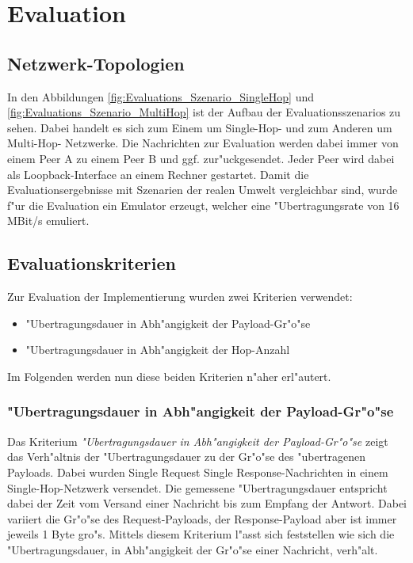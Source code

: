 \chapter{Evaluation}
\label{cha:evaluation}

\section{Netzwerk-Topologien}
In den Abbildungen \ref{fig:Evaluations_Szenario_SingleHop} und \ref{fig:Evaluations_Szenario_MultiHop} ist der Aufbau der Evaluationsszenarios zu sehen. Dabei handelt es sich zum Einem um Single-Hop- und zum Anderen um Multi-Hop- Netzwerke. Die Nachrichten zur Evaluation werden dabei immer von einem Peer A zu einem Peer B und ggf. zur"uckgesendet. Jeder Peer wird dabei als Loopback-Interface an einem Rechner gestartet. Damit die Evaluationsergebnisse mit Szenarien der realen Umwelt vergleichbar sind, wurde f"ur die Evaluation ein Emulator erzeugt, welcher eine "Ubertragungsrate von 16 MBit/s emuliert.

\section{Evaluationskriterien}
Zur Evaluation der Implementierung wurden zwei Kriterien verwendet:
\begin{itemize}
\item "Ubertragungsdauer in Abh"angigkeit der Payload-Gr"o"se
\item "Ubertragungsdauer in Abh"angigkeit der Hop-Anzahl
\end{itemize}
Im Folgenden werden nun diese beiden Kriterien n"aher erl"autert.

\subsection{"Ubertragungsdauer in Abh"angigkeit der Payload-Gr"o"se}
Das Kriterium \emph{"Ubertragungsdauer in Abh"angigkeit der Payload-Gr"o"se} zeigt das Verh"altnis der "Uber\-tra\-gungs\-dauer zu der Gr"o"se des "ubertragenen Payloads. Dabei wurden Single Request Single Response-Nachrichten in einem Single-Hop-Netzwerk versendet. Die gemessene "Uber\-tra\-gungs\-dauer entspricht dabei der Zeit vom Versand einer Nachricht bis zum Empfang der Antwort. Dabei variiert die Gr"o"se des Request-Payloads, der Response-Payload aber ist immer jeweils 1 Byte gro"s. Mittels diesem Kriterium l"asst sich feststellen wie sich die "Uber\-tra\-gungs\-dauer, in Abh"angigkeit der Gr"o"se einer Nachricht, verh"alt.

